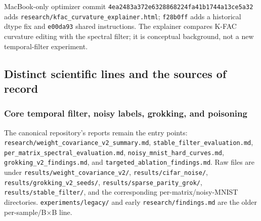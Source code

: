 \documentclass[
  british,
  10pt,
  a4paper,
]{article}
\begin{document}
MacBook-\allowbreak{}only optimizer commit
\texttt{4ea2483a372e\allowbreak{}6328868224fa\allowbreak{}41b1744a13ce\allowbreak{}5a32}
adds
\texttt{research/\allowbreak{}kfac\_\allowbreak{}curvature\_\allowbreak{}explainer.\allowbreak{}html};
\texttt{f28b0ff} adds a historical dtype fix and \texttt{e00da93} shared
instructions\allowbreak{}.\allowbreak{} The explainer compares K-FAC
curvature editing with the spectral filter; it is conceptual
background,\allowbreak{} not a new temporal-\allowbreak{}filter
experiment.\allowbreak{}

\subsection{Distinct scientific lines and the sources of
record}\label{repository-inventory--distinct-scientific-lines-and-the-sources-of-record}

\subsubsection{Core temporal filter, noisy labels, grokking, and
poisoning}\label{repository-inventory--core-temporal-filter-noisy-labels-grokking-and-poisoning}

The canonical repository's reports remain the entry points:
\texttt{research/\allowbreak{}weight\_\allowbreak{}covariance\_\allowbreak{}v2\_\allowbreak{}summary.\allowbreak{}md},
\texttt{stable\_\allowbreak{}filter\_\allowbreak{}evaluation.\allowbreak{}md},
\texttt{per\_\allowbreak{}matrix\_\allowbreak{}spectral\_\allowbreak{}evaluation.\allowbreak{}md},
\texttt{noisy\_\allowbreak{}mnist\_\allowbreak{}hard\_\allowbreak{}curves.\allowbreak{}md},
\texttt{grokking\_\allowbreak{}v2\_\allowbreak{}findings.\allowbreak{}md},
and
\texttt{targeted\_\allowbreak{}ablation\_\allowbreak{}findings.\allowbreak{}md}.
Raw files are under
\texttt{results/\allowbreak{}weight\_\allowbreak{}covariance\_\allowbreak{}v2/\allowbreak{}},
\texttt{results/\allowbreak{}cifar\_\allowbreak{}noise/\allowbreak{}},
\texttt{results/\allowbreak{}grokking\_\allowbreak{}v2\_\allowbreak{}seeds/\allowbreak{}},
\texttt{results/\allowbreak{}sparse\_\allowbreak{}parity\_\allowbreak{}grok/\allowbreak{}},
\texttt{results/\allowbreak{}stable\_\allowbreak{}filter/\allowbreak{}},
and the corresponding
per-\allowbreak{}matrix/\allowbreak{}noisy-\allowbreak{}MNIST
directories.\allowbreak{}
\texttt{experiments/\allowbreak{}legacy/\allowbreak{}} and early
\texttt{research/\allowbreak{}findings.\allowbreak{}md} are the older
per-\allowbreak{}sample/\allowbreak{}B×B line.
\end{document}
